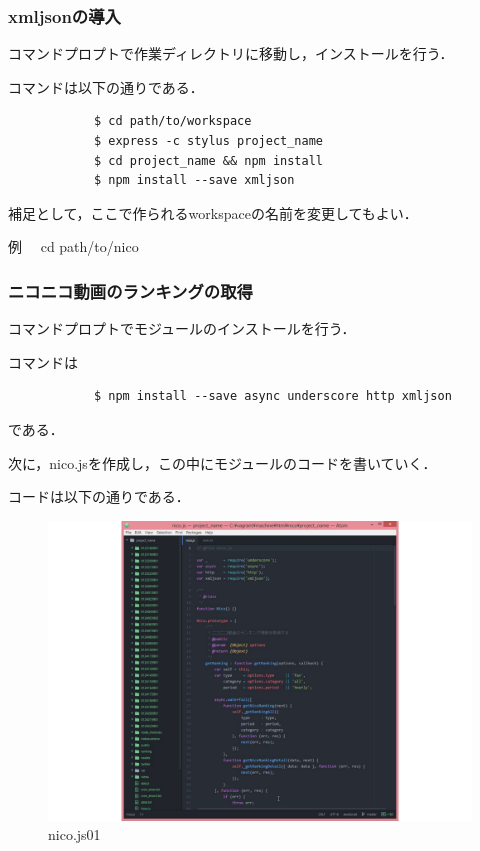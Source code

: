 \subsubsection{xmljsonの導入}
コマンドプロプトで作業ディレクトリに移動し，インストールを行う．

コマンドは以下の通りである．
	\begin{verbatim}
			$ cd path/to/workspace
			$ express -c stylus project_name
			$ cd project_name && npm install
			$ npm install --save xmljson
	\end{verbatim}

補足として，ここで作られるworkspaceの名前を変更してもよい．

例　 cd path/to/nico

\subsubsection{ニコニコ動画のランキングの取得}
コマンドプロプトでモジュールのインストールを行う．

コマンドは
	\begin{verbatim}
			$ npm install --save async underscore http xmljson
	\end{verbatim}
である．

次に，nico.jsを作成し，この中にモジュールのコードを書いていく．

コードは以下の通りである．


	\begin{figure}[h]
		\centering
		\includegraphics[width=14cm]{nico01.pdf}
		\caption{nico.js01}\label{ace}
	\end{figure}



